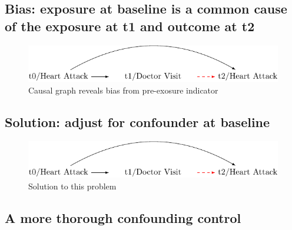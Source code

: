 \documentclass[
  singlecolumn]{report}
\begin{document}
\hypertarget{bias-exposure-at-baseline-is-a-common-cause-of-the-exposure-at-t1-and-outcome-at-t2}{%
\subsection{Bias: exposure at baseline is a common cause of the exposure
at t1 and outcome at
t2}\label{bias-exposure-at-baseline-is-a-common-cause-of-the-exposure-at-t1-and-outcome-at-t2}}

\begin{figure}

{\centering \includegraphics[width=1\textwidth,height=\textheight]{causal-dags_files/figure-pdf/fig-dag-3-1.pdf}

}

\caption{\label{fig-dag-3}Causal graph reveals bias from pre-exosure
indicator}

\end{figure}

\hypertarget{solution-adjust-for-confounder-at-baseline}{%
\subsection{Solution: adjust for confounder at
baseline}\label{solution-adjust-for-confounder-at-baseline}}

\begin{figure}

{\centering \includegraphics[width=1\textwidth,height=\textheight]{causal-dags_files/figure-pdf/fig-dag-4-1.pdf}

}

\caption{\label{fig-dag-4}Solution to this problem}

\end{figure}

\hypertarget{a-more-thorough-confounding-control}{%
\subsection{A more thorough confounding
control}\label{a-more-thorough-confounding-control}}
\end{document}

